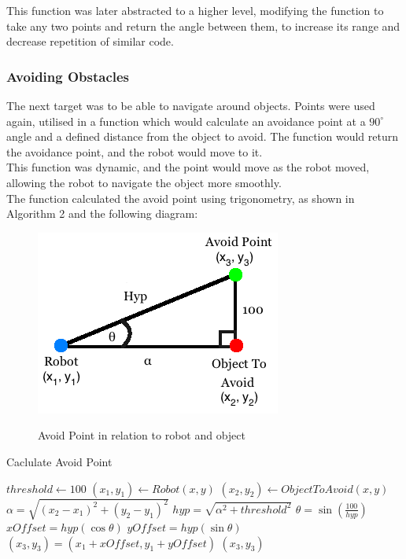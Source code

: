This function was later abstracted to a higher level, modifying the function to take any two points and return the angle between them, to increase its range and decrease repetition of similar code. \linebreak

\subsubsection{Avoiding Obstacles}
The next target was to be able to navigate around objects. Points were used again, utilised in a function which would calculate an avoidance point at a $90^{\circ}$ angle and a defined distance from the object to avoid. The function would return the avoidance point, and the robot would move to it. \\
This function was dynamic, and the point would move as the robot moved, allowing the robot to navigate the object more smoothly.\\
The function calculated the avoid point using trigonometry, as shown in Algorithm 2 and the following diagram:
\begin{center}
\begin{figure}[htp]
\leavevmode
\includegraphics[scale=0.6]{images/AvoidPoints.png}
\label{fig:AvoidPointDiagram}
\caption{Avoid Point in relation to robot and object}
\end{figure}
\end{center}

\begin{algorithm}
\caption{Caclulate Avoid Point}
\label{avoidPoint}
\begin{algorithmic}[1]
\STATE $threshold \gets 100$
\STATE $(x_{1}, y_{1}) \gets Robot (x, y)$
\STATE $(x_{2}, y_{2}) \gets Object To Avoid (x, y)$
\STATE $\alpha = \sqrt{(x_{2} - x_{1})^{2} + (y_{2} - y_{1})^{2}}$
\STATE $hyp = \sqrt{\alpha^{2} + threshold^{2}}$
\STATE $\theta = \sin(\frac{100}{hyp})$
\STATE $xOffset = hyp(\cos\theta)$
\STATE $yOffset = hyp(\sin\theta)$
\STATE $(x_{3}, y_{3}) = (x_{1} + xOffset, y_{1} + yOffset)$
\RETURN $(x_{3}, y_{3})$
\end{algorithmic}
\end{algorithm}

